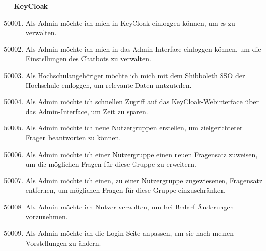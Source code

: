 \textbf{KeyCloak}
\begin{enumerate}[leftmargin=*,labelindent=40pt,label=u\arabic*.]
    \setcounter{enumi}{50000}
    \item Als Admin möchte ich mich in KeyCloak einloggen können, um es zu verwalten.
    \item Als Admin möchte ich mich in das Admin-Interface einloggen können, um die Einstellungen des Chatbots zu verwalten.
    \item Als Hochschulangehöriger möchte ich mich mit dem Shibboleth SSO der Hochschule einloggen, um relevante Daten mitzuteilen.
    \item Als Admin möchte ich schnellen Zugriff auf das KeyCloak-Webinterface über das Admin-Interface, um Zeit zu sparen.
    \item Als Admin möchte ich neue Nutzergruppen erstellen, um zielgerichteter Fragen beantworten zu können.
    \item Als Admin möchte ich einer Nutzergruppe einen neuen Fragensatz zuweisen, um die möglichen Fragen für diese Gruppe zu erweitern.
    \item Als Admin möchte ich einen, zu einer Nutzergruppe zugewiesenen, Fragensatz entfernen, um möglichen Fragen für diese Gruppe einzuschränken.
    \item Als Admin möchte ich Nutzer verwalten, um bei Bedarf Änderungen vorzunehmen.
    \item Als Admin möchte ich die Login-Seite anpassen, um sie nach meinen Vorstellungen zu ändern.
\end{enumerate}



